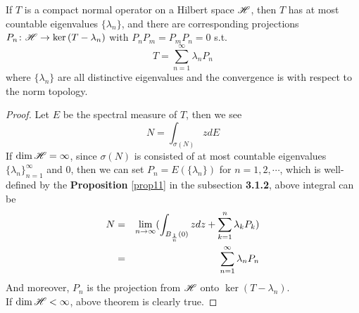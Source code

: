 \documentclass[a4paper,11pt]{report}
\begin{document}
\begin{thm}
	If $T$ is a compact normal operator on a Hilbert space $\mathscr{H}$, then $T$ has at most countable eigenvalues $\{\lambda_n\}$, and there are corresponding projections $P_n \colon \mathscr{H} \rightarrow \ker{(T-\lambda_n)}$ with $P_nP_m=P_mP_n=0$ s.t.
	\begin{equation*}
		T = \sum_{n=1}^{\infty} \lambda_n P_n
	\end{equation*}
	where $\{\lambda_n\}$ are all distinctive eigenvalues and the convergence is with respect to the norm topology.
\end{thm}
\begin{proof}
	Let $E$ be the spectral measure of $T$, then we see
	\begin{equation*}
		N = \int_{\sigma(N)} z dE
	\end{equation*}
	If $\dim{\mathscr{H}} = \infty$, since $\sigma(N)$ is consisted of at most countable eigenvalues $\{\lambda_n\}_{n=1}^{\infty}$ and $0$, then we can set $P_n = E(\{\lambda_n\})$ for $n = 1,2,\cdots$, which is well-defined by the \textbf{Proposition} \ref{prop11} in the subsection \textbf{3.1.2}, above integral can be
	\begin{eqnarray*}
		N &=& \lim_{n \rightarrow \infty} (\int_{B_{\frac{1}{n}}(0)} z dz + \sum_{k=1}^{n} \lambda_k P_k) \\
		&=& \sum_{n=1}^{\infty} \lambda_n P_n
	\end{eqnarray*} 
	And moreover, $P_n$ is the projection from $\mathscr{H}$ onto $\ker{(T-\lambda_n)}$. \\
	If $\dim{\mathscr{H}} < \infty$, above theorem is clearly true.
\end{proof}
\end{document}

